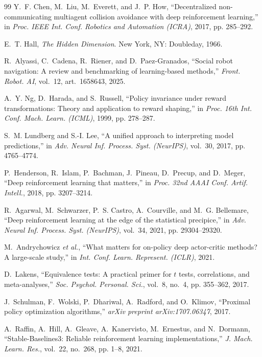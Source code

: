 \documentclass[conference]{IEEEtran}
\begin{document}
\begin{thebibliography}{99}
Y.~F. Chen, M.~Liu, M.~Everett, and J.~P. How, ``Decentralized non-communicating
multiagent collision avoidance with deep reinforcement learning,'' in \emph{Proc.
IEEE Int. Conf. Robotics and Automation (ICRA)}, 2017, pp. 285--292.

E.~T. Hall, \emph{The Hidden Dimension}. New York, NY: Doubleday, 1966.

R.~Alyassi, C.~Cadena, R.~Riener, and D.~Paez-Granados, ``Social robot
navigation: A review and benchmarking of learning-based methods,''
\emph{Front. Robot. AI}, vol.~12, art.~1658643, 2025.

A.~Y. Ng, D.~Harada, and S.~Russell, ``Policy invariance under reward
transformations: Theory and application to reward shaping,'' in \emph{Proc. 16th Int. Conf. Mach. Learn. (ICML)}, 1999, pp. 278--287.

S.~M. Lundberg and S.-I. Lee, ``A unified approach to interpreting model
predictions,'' in \emph{Adv. Neural Inf. Process. Syst. (NeurIPS)}, vol.~30, 2017, pp. 4765--4774.

P.~Henderson, R.~Islam, P.~Bachman, J.~Pineau, D.~Precup, and D.~Meger, ``Deep
reinforcement learning that matters,'' in \emph{Proc. 32nd AAAI Conf. Artif. Intell.}, 2018, pp. 3207--3214.

R.~Agarwal, M.~Schwarzer, P.~S. Castro, A.~Courville, and M.~G. Bellemare,
``Deep reinforcement learning at the edge of the statistical precipice,'' in
\emph{Adv. Neural Inf. Process. Syst. (NeurIPS)}, vol.~34,
2021, pp. 29304--29320.

M.~Andrychowicz \emph{et al.}, ``What matters for on-policy deep actor-critic
methods? A large-scale study,'' in \emph{Int. Conf. Learn. Represent. (ICLR)}, 2021.

D.~Lakens, ``Equivalence tests: A practical primer for $t$ tests, correlations,
and meta-analyses,'' \emph{Soc. Psychol. Personal. Sci.},
vol.~8, no.~4, pp. 355--362, 2017.

J.~Schulman, F.~Wolski, P.~Dhariwal, A.~Radford, and O.~Klimov, ``Proximal
policy optimization algorithms,'' \emph{arXiv preprint arXiv:1707.06347}, 2017.

A.~Raffin, A.~Hill, A.~Gleave, A.~Kanervisto, M.~Ernestus, and N.~Dormann,
``Stable-Baselines3: Reliable reinforcement learning implementations,''
\emph{J. Mach. Learn. Res.}, vol.~22, no.~268, pp. 1--8, 2021.


\end{thebibliography}
\end{document}
